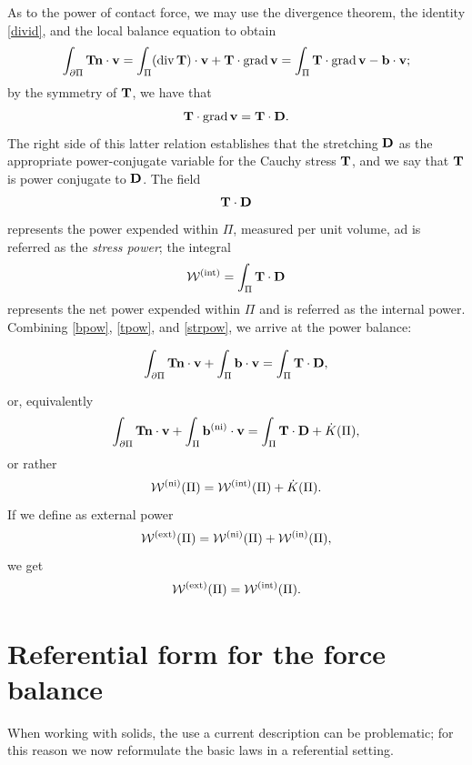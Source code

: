 As to the power of contact force, we may use the divergence theorem, the identity \eqref{divid}, and the local balance equation to obtain
\begin{equation}\label{tpow}
	\int_{\partial\Pi}\mathbf{T}\mathbf{n}\cdot\mathbf{v}=\int_{\Pi}(\operatorname{div}\mathbf{T})\cdot\mathbf{v}+\mathbf{T}\cdot\operatorname{grad}\mathbf{v}=\int_{\Pi}\mathbf{T}\cdot\operatorname{grad}\mathbf{v}-\mathbf{b}\cdot\mathbf{v};
\end{equation}
by the symmetry of $\mathbf{T}$, we have that
\begin{equation}\label{strpow}
	\mathbf{T}\cdot\operatorname{grad}\mathbf{v}=\mathbf{T}\cdot\mathbf{D}.
\end{equation}
The right side of this latter relation establishes that the stretching $\mathbf{D}$ as the appropriate power-conjugate variable for the Cauchy stress $\mathbf{T}$, and we say that $\mathbf{T}$ is power conjugate to $\mathbf{D}$. The field
$$
\mathbf{T}\cdot\mathbf{D}
$$
represents the power expended within $\Pi$, measured per unit volume, ad is referred as the \textit{stress power}; the integral 
\begin{equation}
	\mathcal{W}^{(\rm int)}=\int_{\Pi}\mathbf{T}\cdot\mathbf{D}
\end{equation}
represents the net power expended within $\Pi$ and is referred as the internal power. Combining \eqref{bpow}, \eqref{tpow}, and \eqref{strpow}, we arrive at the power balance:
\begin{definition}
\begin{equation}\label{powerbal}
	\int_{\partial\Pi}\mathbf{T}\mathbf{n}\cdot\mathbf{v}+\int_{\Pi}\mathbf{b}\cdot\mathbf{v}=\int_{\Pi}\mathbf{T}\cdot\mathbf{D},
\end{equation}
\end{definition}
or, equivalently
\begin{equation}
	\int_{\partial\Pi}\mathbf{T}\mathbf{n}\cdot\mathbf{v}+\int_{\Pi}\mathbf{b}^{(\rm ni)}\cdot\mathbf{v}=\int_{\Pi}\mathbf{T}\cdot\mathbf{D}+\dot{K}(\Pi),
\end{equation}
or rather
\begin{equation}
	\mathcal{W}^{(\rm ni)}(\Pi)=\mathcal{W}^{(\rm int)}(\Pi)+\dot{K}(\Pi).
\end{equation}
If we define as external power
\begin{equation}
	\mathcal{W}^{\rm (ext)}(\Pi)=\mathcal{W}^{(\rm ni)}(\Pi)+\mathcal{W}^{(\rm in)}(\Pi),
\end{equation}
we get
\begin{equation}
	\mathcal{W}^{\rm (ext)}(\Pi)=\mathcal{W}^{(\rm int)}(\Pi).
\end{equation}


\section{Referential form for the force balance}
When working with solids, the use a current description can be problematic; for this reason we now reformulate the basic laws in a referential setting.

